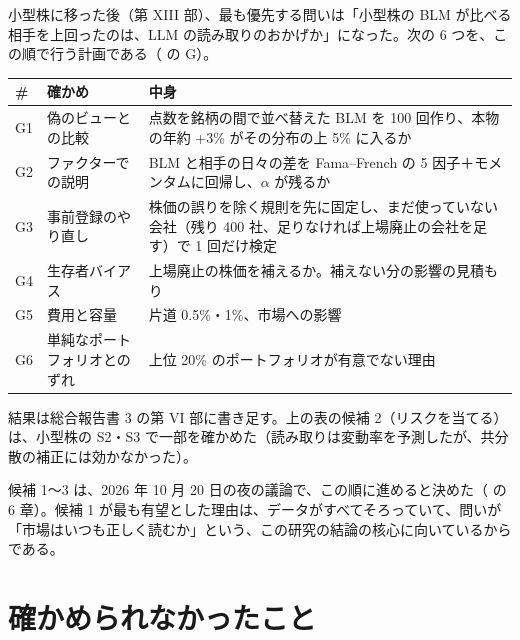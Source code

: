 小型株に移った後（第 XIII 部）、最も優先する問いは「小型株の BLM が比べる相手を上回ったのは、LLM の読み取りのおかげか」になった。次の 6 つを、この順で行う計画である（ の G）。

\begin{longtable}{P{0.8cm}P{5.0cm}P{8.6cm}}
\toprule
\textbf{\#} & \textbf{確かめ} & \textbf{中身} \\
\midrule
\endhead
\bottomrule
\endfoot
G1 & 偽のビューとの比較 & 点数を銘柄の間で並べ替えた BLM を 100 回作り、本物の年約 +3\% がその分布の上 5\% に入るか \\
G2 & ファクターでの説明 & BLM と相手の日々の差を Fama--French の 5 因子＋モメンタムに回帰し、$\alpha$ が残るか \\
G3 & 事前登録のやり直し & 株価の誤りを除く規則を先に固定し、まだ使っていない会社（残り 400 社、足りなければ上場廃止の会社を足す）で 1 回だけ検定 \\
G4 & 生存者バイアス & 上場廃止の株価を補えるか。補えない分の影響の見積もり \\
G5 & 費用と容量 & 片道 0.5\%・1\%、市場への影響 \\
G6 & 単純なポートフォリオとのずれ & 上位 20\% のポートフォリオが有意でない理由 \\
\end{longtable}

結果は総合報告書 3 の第 VI 部に書き足す。上の表の候補 2（リスクを当てる）は、小型株の S2・S3 で一部を確かめた（読み取りは変動率を予測したが、共分散の補正には効かなかった）。

候補 1〜3 は、2026 年 10 月 20 日の夜の議論で、この順に進めると決めた（ の 6 章）。候補 1 が最も有望とした理由は、データがすべてそろっていて、問いが「市場はいつも正しく読むか」という、この研究の結論の核心に向いているからである。

\section{確かめられなかったこと}

